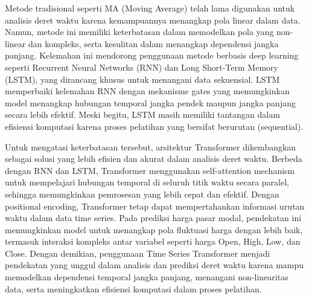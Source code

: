 Metode tradisional seperti MA (Moving Average) telah lama digunakan untuk analisis deret waktu karena kemampuannya menangkap pola linear dalam data. Namun, metode ini memiliki keterbatasan dalam memodelkan pola yang non-linear dan kompleks, serta kesulitan dalam menangkap dependensi jangka panjang. Kelemahan ini mendorong penggunaan metode berbasis deep learning seperti Recurrent Neural Networks (RNN) dan Long Short-Term Memory (LSTM), yang dirancang khusus untuk menangani data sekuensial. LSTM memperbaiki kelemahan RNN dengan mekanisme gates yang memungkinkan model menangkap hubungan temporal jangka pendek maupun jangka panjang secara lebih efektif. Meski begitu, LSTM masih memiliki tantangan dalam efisiensi komputasi karena proses pelatihan yang bersifat berurutan (sequential).

Untuk mengatasi keterbatasan tersebut, arsitektur Transformer dikembangkan sebagai solusi yang lebih efisien dan akurat dalam analisis deret waktu. Berbeda dengan RNN dan LSTM, Transformer menggunakan self-attention mechanism untuk mempelajari hubungan temporal di seluruh titik waktu secara paralel, sehingga memungkinkan pemrosesan yang lebih cepat dan efektif. Dengan positional encoding, Transformer tetap dapat mempertahankan informasi urutan waktu dalam data time series. Pada prediksi harga pasar modal, pendekatan ini memungkinkan model untuk menangkap pola fluktuasi harga dengan lebih baik, termasuk interaksi kompleks antar variabel seperti harga Open, High, Low, dan Close. Dengan demikian, penggunaan Time Series Transformer menjadi pendekatan yang unggul dalam analisis dan prediksi deret waktu karena mampu memodelkan dependensi temporal jangka panjang, menangani non-linearitas data, serta meningkatkan efisiensi komputasi dalam proses pelatihan. 

